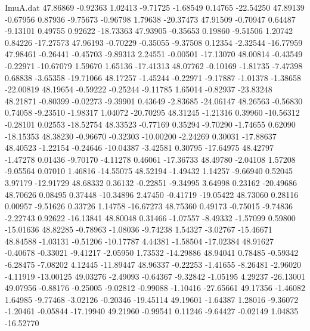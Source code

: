 \begin{filecontents}{ImuA.dat}
  47.86869   -0.92363    1.02413   -9.71725   -1.68549    0.14765  -22.54250
  47.89139   -0.67956    0.87936   -9.75673   -0.96798    1.79638  -20.37473
  47.91509   -0.70947    0.64487   -9.13101    0.49755    0.92622  -18.73363
  47.93905   -0.35653    0.19860   -9.51506    1.20742    0.84226  -17.27573
  47.96193   -0.70229   -0.35055   -9.37508    0.12354   -2.32544  -16.77959
  47.98461   -0.26441   -0.45703   -9.89313    2.24551   -0.00501  -17.13070
  48.00814   -0.43549   -0.22971  -10.67079    1.59670    1.65136  -17.41313
  48.07762   -0.10169   -1.81735   -7.47398    0.68838   -3.65358  -19.71066
  48.17257   -1.45244   -0.22971   -9.17887   -1.01378   -1.38658  -22.00819
  48.19654   -0.59222   -0.25244   -9.11785    1.65014   -0.82937  -23.83248
  48.21871   -0.80399   -0.02273   -9.39901    0.43649   -2.83685  -24.06147
  48.26563   -0.56830    0.74058   -9.23510   -1.98317    1.04072  -20.70295
  48.31245   -1.21316    0.39960  -10.56312   -0.28101    0.02553  -18.52754
  48.33523   -0.77169    0.35294   -9.70290   -1.74655    0.62090  -18.15353
  48.38230   -0.96670   -0.32303  -10.00200   -2.24269    0.30031  -17.88637
  48.40523   -1.22154   -0.24646  -10.04387   -3.42581    0.30795  -17.64975
  48.42797   -1.47278    0.01436   -9.70170   -4.11278    0.46061  -17.36733
  48.49780   -2.04108    1.57208   -9.05564    0.07010    1.46816  -14.55075
  48.52194   -1.49432    1.14257   -9.66940    0.52045    3.97179  -12.91729
  48.68332    0.36132   -0.22851   -9.34995    3.64998    0.23162  -20.49686
  48.70626    0.08495    0.37448  -10.34896    2.47450   -0.41719  -19.05422
  48.73060    0.28116    0.00957   -9.51626    0.33726    1.14758  -16.67273
  48.75360    0.49173   -0.75015   -9.74836   -2.22743    0.92622  -16.13841
  48.80048    0.31466   -1.07557   -8.49332   -1.57099    0.59800  -15.01636
  48.82285   -0.78963   -1.08036   -9.74238    1.54327   -3.02767  -15.46671
  48.84588   -1.03131   -0.51206  -10.17787    4.44381   -1.58504  -17.02384
  48.91627   -0.40678   -0.33021   -9.41217   -2.05950    1.73532  -14.29886
  48.94041    0.78485   -0.59342   -6.28475   -7.08202    4.12445  -11.89447
  48.96337   -0.22253   -1.41655   -8.26481   -2.96020   -4.11919  -13.00125
  49.03276   -2.49093   -0.64367   -9.32842   -1.05195    4.29237  -26.13001
  49.07956   -0.88176   -0.25005   -9.02812   -0.99088   -1.10416  -27.65661
  49.17356   -1.46082    1.64985   -9.77468   -3.02126   -0.20346  -19.45114
  49.19601   -1.64387    1.28016   -9.36072   -1.20461   -0.05844  -17.19940
  49.21960   -0.99541    0.11246   -9.64427   -0.02149    1.04835  -16.52770

\end{filecontents}
